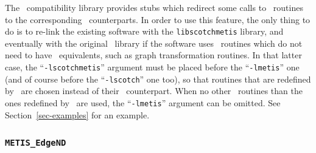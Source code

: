The \metis\ compatibility library provides stubs which redirect some
calls to \metis\ routines to the corresponding \scotch\ counterparts.
In order to use this feature, the only thing to do is to re-link the
existing software with the {\tt lib\lbo scotch\lbo metis} library, and
eventually with the original \metis\ library if the software uses
\metis\ routines which do not need to have \scotch\ equivalents, such
as graph transformation routines.
In that latter case, the ``{\tt -lscotch\lbt metis}'' argument must be
placed before the ``{\tt -lmetis}'' one (and of course before the
``{\tt -lscotch}'' one too), so that routines that are redefined by
\scotch\ are chosen instead of their \metis\ counterpart. When no
other \metis\ routines than the ones redefined by \scotch\ are used,
the ``{\tt -lmetis}'' argument can be omitted. See
Section~\ref{sec-examples} for an example.

\subsubsection{{\tt METIS\_EdgeND}}

